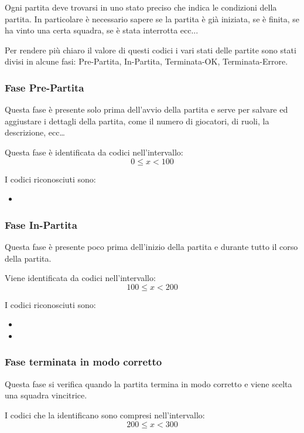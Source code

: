 Ogni partita deve trovarsi in uno stato preciso che indica le condizioni della partita. In particolare è necessario sapere se la partita è già iniziata, se è finita, se ha vinto una certa squadra, se è stata interrotta ecc...

Per rendere più chiaro il valore di questi codici i vari stati delle partite sono stati divisi in alcune fasi: Pre-Partita, In-Partita, Terminata-OK, Terminata-Errore.

\subsubsection{Fase Pre-Partita}
Questa fase è presente solo prima dell'avvio della partita e serve per salvare ed aggiustare i dettagli della partita, come il numero di giocatori, di ruoli, la descrizione, ecc\dots

Questa fase è identificata da codici nell'intervallo:
\[
0 \le x < 100
\]

I codici riconosciuti sono:
\begin{itemize}
	\item {}
\end{itemize}


\subsubsection{Fase In-Partita}
Questa fase è presente poco prima dell'inizio della partita e durante tutto il corso della partita. 

Viene identificata da codici nell'intervallo:
\[
100 \le x < 200
\]

I codici riconosciuti sono:
\begin{itemize}
	\item {}
	\item {}
\end{itemize}


\subsubsection{Fase terminata in modo corretto}
Questa fase si verifica quando la partita termina in modo corretto e viene scelta una squadra vincitrice.

I codici che la identificano sono compresi nell'intervallo:
\[
200 \le x < 300
\]

